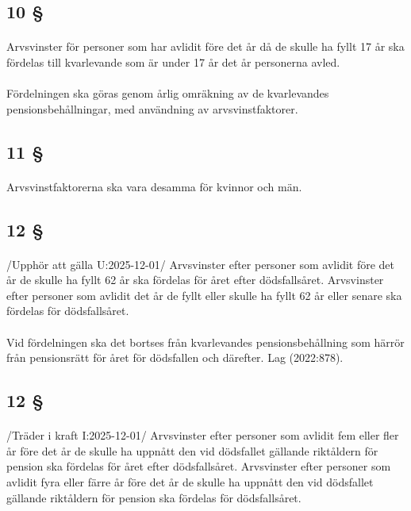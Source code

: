 \documentclass[a4paper,notitlepage,openany,10pt]{book}
\begin{document}
\subsection*{10 §}
\paragraph*{}
Arvsvinster för personer som har avlidit före det år då de skulle ha fyllt 17 år ska fördelas till kvarlevande som är under 17 år det år personerna avled.
\paragraph*{}
Fördelningen ska göras genom årlig omräkning av de kvarlevandes pensionsbehållningar, med användning av arvsvinstfaktorer.
\subsection*{11 §}
\paragraph*{}
Arvsvinstfaktorerna ska vara desamma för kvinnor och män.
\subsection*{12 §}
\paragraph*{}
/Upphör att gälla U:2025-12-01/
Arvsvinster efter personer som avlidit före det år de skulle ha fyllt 62 år ska fördelas för året efter dödsfallsåret. Arvsvinster efter personer som avlidit det år de fyllt eller skulle ha fyllt 62 år eller senare ska fördelas för dödsfallsåret.
\paragraph*{}
Vid fördelningen ska det bortses från kvarlevandes pensionsbehållning som härrör från pensionsrätt för året för dödsfallen och därefter.
Lag (2022:878).
\subsection*{12 §}
\paragraph*{}
/Träder i kraft I:2025-12-01/
Arvsvinster efter personer som avlidit fem eller fler år före det år de skulle ha uppnått den vid dödsfallet gällande riktåldern för pension ska fördelas för året efter dödsfallsåret. Arvsvinster efter personer som avlidit fyra eller färre år före det år de skulle ha uppnått den vid dödsfallet gällande riktåldern för pension ska fördelas för dödsfallsåret.
\end{document}
